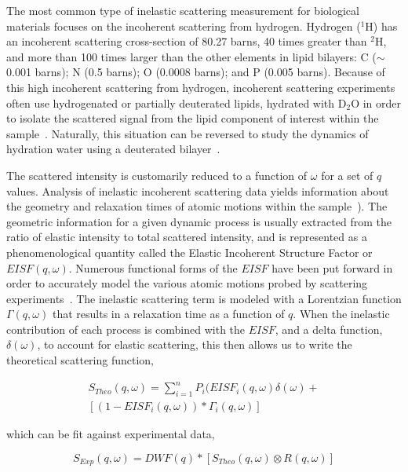 \documentclass[8.5pt,twoside,twocolumn]{article}
\begin{document}
The most common type of inelastic scattering measurement for biological materials focuses on the incoherent scattering from hydrogen. Hydrogen ($^1$H) has an incoherent scattering cross-section of 80.27 barns, 40 times greater than $^2$H, and more than 100 times larger than the other elements in lipid bilayers: C ($\sim$0.001 barns); N (0.5 barns); O (0.0008 barns); and P (0.005 barns). Because of this high incoherent scattering from hydrogen, incoherent scattering experiments often use hydrogenated or partially deuterated lipids, hydrated with D$_2$O in order to isolate the scattered signal from the lipid component of interest within the sample~\cite{Pfeiffer.1989,Wood.2008,Armstrong.2010,Konig.1992,Rheinstadter.2012,Rheinstadter.2005,Swenson.2008,Fitter.1999}. Naturally, this situation can be reversed to study the dynamics of hydration water using a deuterated bilayer~\cite{Swenson.2008,Konig.1994,Nickels.2012}.

The scattered intensity is customarily reduced to a function of $\omega$ for a set of $q$ values. Analysis of inelastic incoherent scattering data yields information about the geometry and relaxation times of atomic motions within the sample~\cite{Vineyard.1958}). The geometric information for a given dynamic process is usually extracted from the ratio of elastic intensity to total scattered intensity, and is represented as a phenomenological quantity called the Elastic Incoherent Structure Factor or $EISF(q,\omega)$. Numerous functional forms of the $EISF$ have been put forward in order to accurately model the various atomic motions probed by scattering experiments~\cite{Fitter.1996}. The inelastic scattering term is modeled with a Lorentzian function $\Gamma(q,\omega)$ that results in a relaxation time as a function of $q$. When the inelastic contribution of each process is combined with the $EISF$, and a delta function, $\delta(\omega)$, to account for elastic scattering, this then allows us to write the theoretical scattering function,  


\begin{eqnarray}
\label{eq:Jon4}
S_{Theo}(q,\omega)= \sum_{i=1}^{n} P_i(EISF_i(q,\omega)\delta(\omega) + \nonumber \\ 
\left[(1-EISF_i(q,\omega)) \ast \Gamma_i(q,\omega) \right]
\end{eqnarray}

which can be fit against experimental data,

\begin{equation}
\label{eq:Jon5}
S_{Exp}(q,\omega)= DWF(q) \ast \left[ S_{Theo}(q,\omega) \otimes R(q,\omega) \right]
\end{equation}
\end{document}
